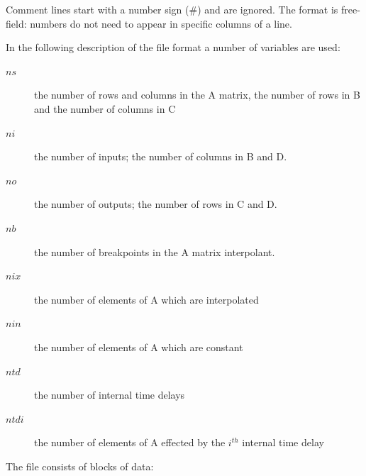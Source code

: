 \documentclass[10pt,openany,twoside]{book}
\numberwithin{equation}{section}   %
\begin{document}
Comment lines start with a number sign (\#) and
are ignored.
The format is free-field: numbers do not need to
appear in specific columns of a line.
\par
In the following description of the file format a
number of variables are used:
\begin{description}
	\item[$ns$] the number of rows and columns in the A matrix,
                the number of rows in B and the number of columns in C
	\item[$ni$] the number of inputs; the number of columns in B and D.
	\item[$no$] the number of outputs; the number of rows in C and D.
	\item[$nb$] the number of breakpoints in the A matrix interpolant.
	\item[$nix$] the number of elements of A which are interpolated
	\item[$nin$] the number of elements of A which are constant
	\item[$ntd$] the number of internal time delays
	\item[$ntdi$] the number of elements of A effected by the
						$i^{th}$ internal time delay
\end{description}
\par
The file consists of blocks of data:
\end{document}
